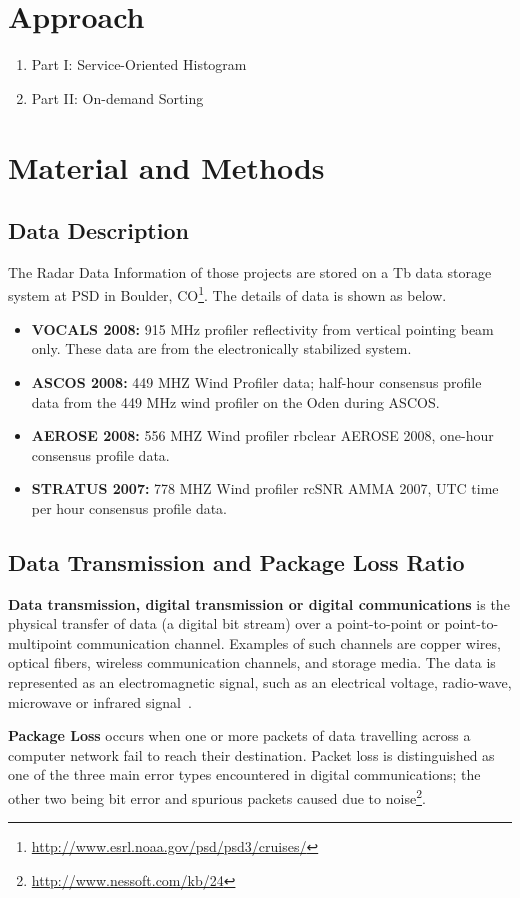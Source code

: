 \documentclass[times, 10pt,onecolumn]{article} %
\begin{document}
\section{Approach}
\begin{enumerate}
\item{Part I: Service-Oriented Histogram}
\item{Part II: On-demand Sorting}
\end{enumerate}
\section{Material and Methods}
\subsection{Data Description}
The Radar Data Information of those projects are stored on a Tb data storage system at PSD in Boulder, CO\footnote{\url{http://www.esrl.noaa.gov/psd/psd3/cruises/}}. The details of data is shown as below.
\begin{itemize}
  \item \textbf{VOCALS 2008:} 915 MHz profiler reflectivity from vertical pointing beam only. These data are from the electronically stabilized system. 
\item \textbf{ASCOS 2008:} 449 MHZ Wind Profiler data; half-hour consensus profile data from the 449 MHz wind profiler on the Oden during ASCOS.  
\item \textbf{AEROSE 2008:} 556 MHZ Wind profiler rbclear AEROSE 2008, one-hour consensus profile data.
\item \textbf{STRATUS 2007:} 778 MHZ Wind profiler rcSNR AMMA 2007, UTC time per hour consensus profile data.
\end{itemize}
\subsection{Data Transmission and Package Loss Ratio}
\textbf{Data transmission, digital transmission or digital communications} is the physical transfer of data (a digital bit stream) over a point-to-point or point-to-multipoint communication channel. Examples of such channels are copper wires, optical fibers, wireless communication channels, and storage media. The data is represented as an electromagnetic signal, such as an electrical voltage, radio-wave, microwave or infrared signal~\cite{PDAT}. 

\textbf{Package Loss} occurs when one or more packets of data travelling across a computer network fail to reach their destination. Packet loss is distinguished as one of the three main error types encountered in digital communications; the other two being bit error and spurious packets caused due to noise\footnote{\url{http://www.nessoft.com/kb/24}}.
\end{document}
